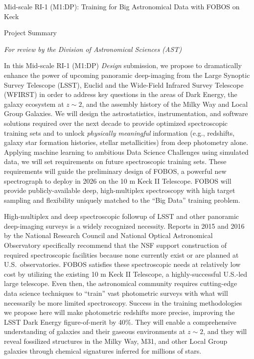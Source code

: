 \documentclass[oneside,11pt]{amsart}
\begin{document}


\vspace*{-1.5cm}

\centerline{\textsf {\Large Mid-scale RI-1 (M1:DP): Training for Big Astronomical Data with FOBOS on Keck}}
\centerline{\textsf {\large Project Summary}}
\centerline{\emph{{\small For review by the Division of Astronomical Sciences (AST)}}}

 In this Mid-scale RI-1 (M1:DP) \emph{Design}
submission, we propose to dramatically enhance the power of upcoming
panoramic deep-imaging from the Large Synoptic Survey Telescope (LSST),
Euclid and the Wide-Field Infrared Survey Telescope (WFIRST) in order to
address key questions in the areas of Dark Energy, the galaxy ecosystem
at $z\sim2$, and the assembly history of the Milky Way and Local Group
Galaxies.  We will design the astrostatistics, instrumentation, and
software solutions required over the next decade to provide optimized
spectroscopic training sets and to unlock \emph{physically meaningful}
information (e.g., redshifts, galaxy star formation histories, stellar
metallicities) from deep photometry alone.  Applying machine learning to
ambitious Data Science Challenges using simulated data, we will set
requirements on future spectroscopic training sets.  These requirements
will guide the preliminary design of FOBOS, a powerful new spectrograph
to deploy in 2026 on the 10 m Keck II Telescope.  FOBOS will provide
publicly-available deep, high-multiplex spectroscopy with high target
sampling and flexibility uniquely matched to the ``Big Data'' training
problem.

 High-multiplex and deep
spectroscopic followup of LSST and other panoramic deep-imaging surveys
is a widely recognized necessity.  Reports in 2015 and 2016 by the
National Research Council and National Optical Astronomical Observatory
specifically recommend that the NSF support construction of required
spectroscopic facilities because none currently exist or are planned at
U.S.\ observatories.  FOBOS satisfies these spectroscopic needs at
relatively low cost by utilizing the existing 10 m Keck II Telescope, a
highly-successful U.S.-led large telescope.  Even then, the astronomical
community requires cutting-edge data science techniques to ``train''
vast photometric surveys with what will necessarily be more limited
spectroscopy.  Success in the training methodologies we propose here
will make photometric redshifts more precise, improving the LSST Dark
Energy figure-of-merit by 40\%.  They will enable a comprehensive
understanding of galaxies and their gaseous environments at $z\sim2$,
and they will reveal fossilized structures in the Milky Way, M31, and
other Local Group galaxies through chemical signatures inferred for
millions of stars.
\end{document}
